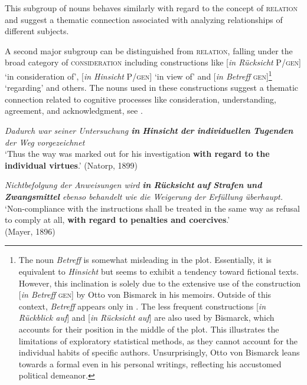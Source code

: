 \documentclass[output=paper,colorlinks,citecolor=brown]{langscibook}
\begin{document}
This subgroup of nouns behaves similarly with regard to the concept of \textsc{relation} and suggest a thematic connection associated with analyzing relationships of different subjects. 

A second major subgroup can be distinguished from \textsc{relation}, falling under the broad category of \textsc{consideration} including constructions like [\textit{in Rücksicht} P/\textsc{gen}] ‘in consideration of', [\textit{in Hinsicht} P/\textsc{gen}] ‘in view of' and [\textit{in Betreff} \textsc{gen}]\footnote{The noun \textit{Betreff} is somewhat misleading in the plot. Essentially, it is equivalent to \textit{Hinsicht} but seems to exhibit a tendency toward fictional texts. However, this inclination is solely due to the extensive use of the construction [\textit{in Betreff} \textsc{gen}] by Otto von Bismarck in his memoirs. Outside of this context, \textit{Betreff} appears only in . The less frequent constructions [\textit{in Rückblick auf}] and [\textit{in Rücksicht auf}] are also used by Bismarck, which accounts for their position in the middle of the plot. This illustrates the limitations of exploratory statistical methods, as they cannot account for the individual habits of specific authors. Unsurprisingly, Otto von Bismarck leans towards a formal  even in his personal writings, reflecting his accustomed political demeanor.} ‘regarding' and others. The nouns used in these constructions suggest a thematic connection related to cognitive processes like consideration, understanding, agreement, and acknowledgment, see .

\ea%
\label{ex:fleissner:9}
{\itshape Dadurch war seiner Untersuchung \textbf{in} \textbf{Hinsicht} \textbf{der} \textbf{individuellen} \textbf{Tugenden} der Weg vorgezeichnet}\\
\glt ‘Thus the way was marked out for his investigation \textbf{with regard to the individual virtues}.' \hfill (Natorp, 1899)
\z 
         
\ea%
\label{ex:fleissner:10}
{\itshape Nichtbefolgung der Anweisungen wird \textbf{in} \textbf{Rücksicht} \textbf{auf} \textbf{Strafen}  \textbf{und} \textbf{Zwangsmittel} ebenso behandelt wie die Weigerung der Erfüllung überhaupt.}\\
\glt ‘Non-compliance with the instructions shall be treated in the same way as refusal to comply at all, \textbf{with regard to penalties and coercives}.'\\ \hfill (Mayer, 1896)
\z 
        
\end{document}

